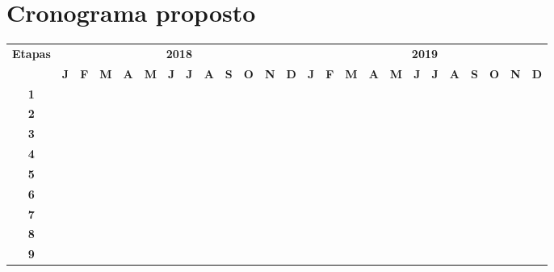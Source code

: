 \pagebreak
\section{Cronograma proposto}
\label{cro}
\begin{center}

\vspace{0.5cm}
{\tiny
\noindent \begin{tabular}{|c||c|c|c|c|c|c|c|c|c|c|c|c||c|c|c|c|c|c|c|c|c|c|c|c|}
  \hline
  \multirow{2}{*}{\textbf{\small{Etapas}}} & \multicolumn{12}{|c||}{\textbf{\small{2018}}} & \multicolumn{12}{|c|}{\textbf{\small{2019}}} \\
  \cline{2-25}
   & \textbf{J} & \textbf{F} & \textbf{M} & \textbf{A} & \textbf{M} & \textbf{J} & \textbf{J} & \textbf{A} & \textbf{S} & \textbf{O} & \textbf{N} & \textbf{D} & \textbf{J} & \textbf{F} & \textbf{M} & \textbf{A} & \textbf{M} & \textbf{J} & \textbf{J} & \textbf{A} & \textbf{S} & \textbf{O} & \textbf{N} & \textbf{D} \\
  \hline \hline
  \textbf{\small{ 1}} &  &  &  &  &  &  &  & \cellcolor{black} &  &  &  &  &  &  &  &  &  &  &  &  &  &  &  & \\ \hline
  \textbf{\small{ 2}} &  &  &  &  &  &  &  & \cellcolor{black} &  &  &  &  &  &  &  &  &  &  &  &  &  &  &  & \\ \hline
  \textbf{\small{ 3}} &  &  &  &  &  &  &  & \cellcolor{black} & \cellcolor{black} &  &  &  &  &  &  &  &  &  &  &  &  &  &  & \\ \hline
  \textbf{\small{ 4}} &  &  &  &  &  &  &  & \cellcolor{black} & \cellcolor{black} &  &  &  &  &  &  &  &  &  &  &  &  &  &  & \\ \hline
  \textbf{\small{ 5}} &  &  &  &  &  &  &  &  &  & \cellcolor{black} &  &  &  &  &  &  &  &  &  &  &  &  &  & \\ \hline
  \textbf{\small{ 6}} &  &  &  &  &  &  &  &  &  & \cellcolor{black} &  &  &  &  &  &  &  &  &  &  &  &  &  & \\ \hline
  \textbf{\small{ 7}} &  &  &  &  &  &  &  & \cellcolor{black} & \cellcolor{black} & \cellcolor{black} & \cellcolor{black} &  &  &  &  &  &  &  &  &  &  &  &  & \\ \hline
  \textbf{\small{ 8}} &  &  &  &  &  &  &  &  &  &  &  & \cellcolor{black} & \cellcolor{black} &  &  &  &  &  &  &  &  &  &  & \\ \hline
  \textbf{\small{ 9}} &  &  &  &  &  &  &  &  &  &  &  & \cellcolor{black} & \cellcolor{black} &  &  &  &  &  &  &  &  &  &  & \\ \hline

\end{tabular}}
\end{center}
